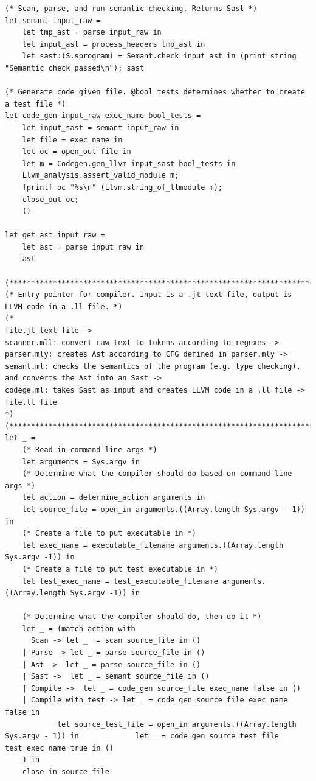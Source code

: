 \documentclass{article}
\begin{document}
\begin{lstlisting}
(* Scan, parse, and run semantic checking. Returns Sast *)
let semant input_raw = 
	let tmp_ast = parse input_raw in
	let input_ast = process_headers tmp_ast in
	let sast:(S.sprogram) = Semant.check input_ast in (print_string "Semantic check passed\n"); sast

(* Generate code given file. @bool_tests determines whether to create a test file *)
let code_gen input_raw exec_name bool_tests =
	let input_sast = semant input_raw in
	let file = exec_name in
	let oc = open_out file in
	let m = Codegen.gen_llvm input_sast bool_tests in 
	Llvm_analysis.assert_valid_module m;
	fprintf oc "%s\n" (Llvm.string_of_llmodule m); 
	close_out oc;
	()

let get_ast input_raw =
	let ast = parse input_raw in
	ast

(*************************************************************************************)
(* Entry pointer for compiler. Input is a .jt text file, output is LLVM code in a .ll file. *)
(* 
file.jt text file -> 
scanner.mll: convert raw text to tokens according to regexes -> 
parser.mly: creates Ast according to CFG defined in parser.mly -> 
semant.ml: checks the semantics of the program (e.g. type checking), and converts the Ast into an Sast -> 
codege.ml: takes Sast as input and creates LLVM code in a .ll file ->
file.ll file 
*)
(*************************************************************************************)
let _ =
	(* Read in command line args *)
	let arguments = Sys.argv in
	(* Determine what the compiler should do based on command line args *)
	let action = determine_action arguments in
	let source_file = open_in arguments.((Array.length Sys.argv - 1)) in
	(* Create a file to put executable in *)
	let exec_name = executable_filename arguments.((Array.length Sys.argv -1)) in
	(* Create a file to put test executable in *)
	let test_exec_name = test_executable_filename arguments.((Array.length Sys.argv -1)) in
	
	(* Determine what the compiler should do, then do it *)
	let _ = (match action with 
	  Scan -> let _  = scan source_file in ()
 	| Parse -> let _ = parse source_file in ()
 	| Ast ->  let _ = parse source_file in ()
 	| Sast ->  let _ = semant source_file in () 
	| Compile ->  let _ = code_gen source_file exec_name false in ()
	| Compile_with_test -> let _ = code_gen source_file exec_name false in 
			let source_test_file = open_in arguments.((Array.length Sys.argv - 1)) in 			  let _ = code_gen source_test_file test_exec_name true in ()
	) in
	close_in source_file

\end{lstlisting}
\end{document}
